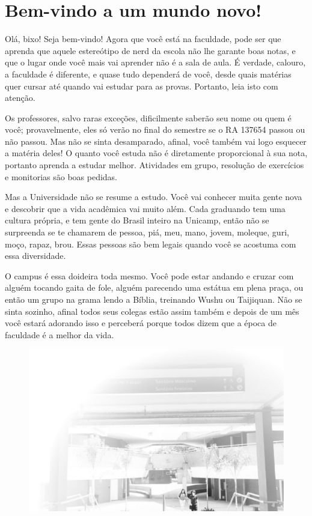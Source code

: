 
\section{Bem-vindo a um mundo novo!}

Olá, bixo! Seja bem-vindo! Agora que você está na faculdade, pode ser que aprenda que aquele estereótipo de nerd
da escola não lhe garante boas notas, e que o lugar onde você mais vai aprender não
é a sala de aula. É verdade, calouro, a faculdade é diferente, e quase tudo
dependerá de você, desde quais matérias quer cursar até quando vai estudar para
as provas. Portanto, leia isto com atenção.

Os professores, salvo raras exceções, dificilmente saberão seu nome ou quem é você; provavelmente, eles só verão
no final do semestre se o RA 137654  passou ou não passou. Mas não se sinta
desamparado, afinal, você também vai logo esquecer a matéria deles! O quanto você
estuda não é diretamente proporcional à sua nota, portanto aprenda a estudar
melhor. Atividades em grupo, resolução de exercícios e monitorias são boas pedidas.

Mas a Universidade não se resume a estudo. Você vai conhecer muita gente nova e
descobrir que a vida acadêmica vai muito além.
Cada graduando tem uma cultura própria, e tem gente do
Brasil inteiro na Unicamp, então não se surpreenda se te chamarem de
pessoa, piá, meu, mano, jovem, moleque, guri, moço, rapaz,
brou. Essas pessoas são bem legais quando você se acostuma com essa
diversidade.

O campus é essa doideira toda mesmo. Você pode estar andando e
cruzar com alguém tocando gaita de fole, alguém parecendo uma
estátua em plena praça, ou então um grupo na grama lendo a Bíblia, treinando
Wushu ou Taijiquan. Não se sinta sozinho, afinal todos seus colegas estão assim
também e depois de um mês você estará adorando isso e perceberá porque todos
dizem que a época de faculdade é a melhor da vida.

\begin{figure}
    \includegraphics[scale=0.5, keepaspectratio=true]{img/imgs/1-boas_vindas/-007.jpg}
\end{figure}

